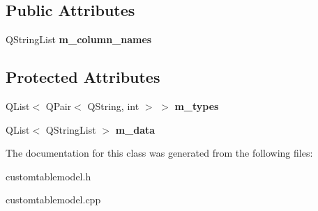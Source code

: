 \subsection*{Public Attributes}
\begin{DoxyCompactItemize}
\item 
\mbox{\label{class_custom_table_model_af039586acef435fc4090b775101a3589}} 
Q\+String\+List {\bfseries m\+\_\+column\+\_\+names}
\end{DoxyCompactItemize}
\subsection*{Protected Attributes}
\begin{DoxyCompactItemize}
\item 
\mbox{\label{class_custom_table_model_a8ec6cce6f60343f187d5791ae342b8e3}} 
Q\+List$<$ Q\+Pair$<$ Q\+String, int $>$ $>$ {\bfseries m\+\_\+types}
\item 
\mbox{\label{class_custom_table_model_ac8faea1ca0763add8fd5436de72fa22a}} 
Q\+List$<$ Q\+String\+List $>$ {\bfseries m\+\_\+data}
\end{DoxyCompactItemize}


The documentation for this class was generated from the following files\+:\begin{DoxyCompactItemize}
\item 
customtablemodel.\+h\item 
customtablemodel.\+cpp\end{DoxyCompactItemize}
